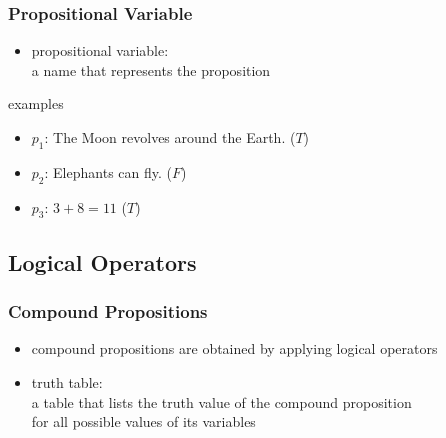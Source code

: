 \documentclass[dvipsnames]{beamer}
\begin{document}
\begin{frame}
  \frametitle{Propositional Variable}

  \begin{itemize}
    \item \alert{propositional variable}:\\
      a name that represents the proposition
  \end{itemize}

  \begin{exampleblock}{examples}
    \begin{itemize}
      \item $p_1$: The Moon revolves around the Earth. ($T$)
      \item $p_2$: Elephants can fly. ($F$)
      \item $p_3$: $3+8=11$ ($T$)
    \end{itemize}
  \end{exampleblock}
\end{frame}

\subsection{Logical Operators}

\begin{frame}
  \frametitle{Compound Propositions}

  \begin{itemize}
    \item compound propositions are obtained by applying
      \alert{logical operators}
  \end{itemize}

  \pause
  \bigskip
  \begin{itemize}
    \item \alert{truth table}:\\
      a table that lists the truth value of the compound proposition\\
      for all possible values of its variables
  \end{itemize}
\end{frame}
\end{document}
